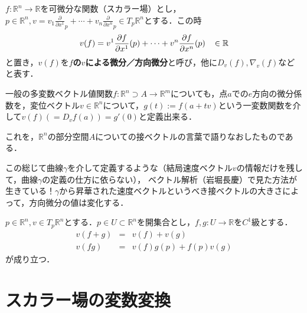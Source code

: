 \documentclass[uplatex, dvipdfmx]{jsreport}
\begin{document}
\begin{definition}
    $f:\mathbb{R}^n\to\mathbb{R}$を可微分な関数（スカラー場）とし，$p\in\mathbb{R}^n,v=v_1\frac{\partial}{\partial x^1}_p + \cdots + v_n\frac{\partial}{\partial x^n}_p\in T_p\mathbb{R}^n$とする．この時
    \[ v(f)=v^1 \frac{\partial f}{\partial x^1}(p)+\cdots +v^n\frac{\partial f}{\partial x^n}(p)\hspace{3mm}\in\mathbb{R} \]
    と置き，$v(f)$を\textbf{$f$の$v$による微分／方向微分}と呼び，他に$D_v(f),\nabla_v(f)$などと表す．
\end{definition}
\begin{remark}
    一般の多変数ベクトル値関数$f:\mathbb{R}^n\supset A\to\mathbb{R}^m$についても，点$a$での$e$方向の微分係数を，変位ベクトル$v\in\mathbb{R}^n$について，$g(t):=f(a+tv)$という一変数関数を介して$v(f)(=D_vf(a))=g'(0)$と定義出来る．

    これを，$\mathbb{R}^n$の部分空間$A$についての接ベクトルの言葉で語りなおしたものである．
\end{remark}
この総じて曲線$\gamma$を介して定義するような（結局速度ベクトル$v$の情報だけを残して，曲線$\gamma$の定義の仕方に依らない），
ベクトル解析（岩堀長慶）で見た方法が生きている！$\gamma$から昇華された速度ベクトルというべき接ベクトルの大きさによって，方向微分の値は変化する．

\begin{proposition}
    $p\in\mathbb{R}^n,v\in T_p\mathbb{R}^n$とする．$p\in U\subset\mathbb{R}^n$を開集合とし，$f,g:U\to\mathbb{R}$を$C^1$級とする．
    \begin{eqnarray*}
        v(f+g) &=& v(f)+v(g) \\
        v(fg) &=& v(f)g(p) + f(p)v(g)
    \end{eqnarray*}
    が成り立つ．
\end{proposition}

\section{スカラー場の変数変換}
\end{document}
